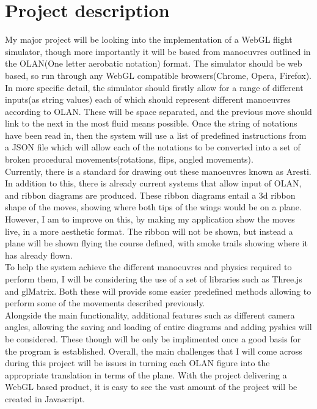 \documentclass[11pt,fleqn,twoside]{article}
\begin{document}
\section{Project description}
My major project will be looking into the implementation of a WebGL flight simulator, though more importantly it will be based from manoeuvres outlined in the OLAN(One letter aerobatic notation) format. The simulator should be web based, so run through any WebGL compatible browsers(Chrome, Opera, Firefox).\\
In more specific detail, the simulator should firstly allow for a range of different inputs(as string values) each of which should represent different manoeuvres according to OLAN. These will be space separated, and the previous move should link to the next in the most fluid means possible. Once the string of notations have been read in, then the system will use a list of predefined instructions from a JSON file which will allow each of the notations to be converted into a set of broken procedural movements(rotations, flips, angled movements).\\
Currently, there is a standard for drawing out these manoeuvres known as Aresti. In addition to this, there is already current systems that allow input of OLAN, and ribbon diagrams are produced. These ribbon diagrams entail a 3d ribbon shape of the moves, showing where both tips of the wings would be on a plane. However, I am to improve on this, by making my application show the moves live, in a more aesthetic format. The ribbon will not be shown, but instead a plane will be shown flying the course defined, with smoke trails showing where it has already flown.  \\
To help the system achieve the different manoeuvres and physics required to perform them, I will be considering the use of a set of libraries such as Three.js and glMatrix. Both these will provide some easier predefined methods allowing to perform some of the movements described previously. \\
Alongside the main functionality, additional features such as different camera angles, allowing the saving and loading of entire diagrams and adding pyshics will be considered. These though will be only be implimented once a good basis for the program is established. Overall, the main challenges that I will come across during this project will be issues in turning each OLAN figure into the appropriate translation in terms of the plane. With the project delivering a WebGL based product, it is easy to see the vast amount of the project will be created in Javascript. 
\end{document}
